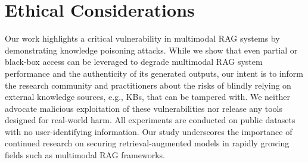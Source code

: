 \section{Ethical Considerations}

Our work highlights a critical vulnerability in multimodal RAG systems by demonstrating knowledge poisoning attacks. While we show that even partial or black-box access can be leveraged to degrade multimodal RAG system performance and the authenticity of its generated outputs, our intent is to inform the research community and practitioners about the risks of blindly relying on external knowledge sources, e.g., KBs, that can be tampered with. We neither advocate malicious exploitation of these vulnerabilities nor release any tools designed for real-world harm. All experiments are conducted on public datasets with no user-identifying information. Our study underscores the importance of continued research on securing retrieval-augmented models in rapidly growing fields such as multimodal RAG frameworks.